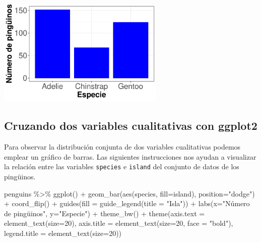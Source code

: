 \documentclass[
  letterpaper,
  DIV=11,
  numbers=noendperiod]{scrreprt}
\newenvironment{Shaded}{\begin{snugshade}}{\end{snugshade}}
\newcommand{\AttributeTok}[1]{\textcolor[rgb]{0.40,0.45,0.13}{#1}}
\newcommand{\DecValTok}[1]{\textcolor[rgb]{0.68,0.00,0.00}{#1}}
\newcommand{\FunctionTok}[1]{\textcolor[rgb]{0.28,0.35,0.67}{#1}}
\newcommand{\NormalTok}[1]{\textcolor[rgb]{0.00,0.23,0.31}{#1}}
\newcommand{\SpecialCharTok}[1]{\textcolor[rgb]{0.37,0.37,0.37}{#1}}
\newcommand{\StringTok}[1]{\textcolor[rgb]{0.13,0.47,0.30}{#1}}
\begin{document}
\begin{center}
\includegraphics[width=0.6\textwidth,height=0.6\textheight]{t1_intro_files/figure-pdf/unnamed-chunk-92-1.pdf}
\end{center}

\subsection{Cruzando dos variables cualitativas con
ggplot2}\label{cruzando-dos-variables-cualitativas-con-ggplot2}

Para observar la distribución conjunta de dos variables cualitativas
podemos emplear un gráfico de barras. Las siguientes instrucciones nos
ayudan a visualizar la relación entre las variables \texttt{species} e
\texttt{island} del conjunto de datos de los pingüinos.

\begin{Shaded}
\begin{Highlighting}[]
\NormalTok{penguins }\SpecialCharTok{\%\textgreater{}\%} \FunctionTok{ggplot}\NormalTok{() }\SpecialCharTok{+} 
  \FunctionTok{geom\_bar}\NormalTok{(}\FunctionTok{aes}\NormalTok{(species, }\AttributeTok{fill=}\NormalTok{island),}
           \AttributeTok{position=}\StringTok{"dodge"}\NormalTok{) }\SpecialCharTok{+} \FunctionTok{coord\_flip}\NormalTok{() }\SpecialCharTok{+}
  \FunctionTok{guides}\NormalTok{(}\AttributeTok{fill =} \FunctionTok{guide\_legend}\NormalTok{(}\AttributeTok{title =} \StringTok{"Isla"}\NormalTok{)) }\SpecialCharTok{+}
  \FunctionTok{labs}\NormalTok{(}\AttributeTok{x=}\StringTok{"Número de pingüinos"}\NormalTok{, }\AttributeTok{y=}\StringTok{"Especie"}\NormalTok{) }\SpecialCharTok{+}
  \FunctionTok{theme\_bw}\NormalTok{() }\SpecialCharTok{+}
  \FunctionTok{theme}\NormalTok{(}\AttributeTok{axis.text =} \FunctionTok{element\_text}\NormalTok{(}\AttributeTok{size=}\DecValTok{20}\NormalTok{),}
        \AttributeTok{axis.title =} \FunctionTok{element\_text}\NormalTok{(}\AttributeTok{size=}\DecValTok{20}\NormalTok{, }\AttributeTok{face =} \StringTok{"bold"}\NormalTok{),}
        \AttributeTok{legend.title =} \FunctionTok{element\_text}\NormalTok{(}\AttributeTok{size=}\DecValTok{20}\NormalTok{)) }
\end{Highlighting}
\end{Shaded}
\end{document}
